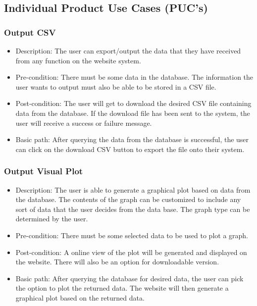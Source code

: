 \documentclass[12pt]{article}
\begin{document}
\newpage  \subsection{Individual Product Use Cases (PUC's)}
\subsubsection{Output CSV}
\begin{itemize}
  \item Description: The user can export/output the data that they have received
  from any function on the website system.
  \item Pre-condition: There must be some data in the database. The information
  the user wants to output must also be able to be stored in a CSV file.
  \item Post-condition: The user will get to download the desired CSV file
  containing data from the database. If the download file has been sent to the
  system, the user will receive a success or failure message.
  \item Basic path: After querying the data from the database is successful, the
  user can click on the download CSV button to export the file onto their system.
\end{itemize}

\subsubsection{Output Visual Plot}
\begin{itemize}
  \item Description: The user is able to generate a graphical plot based on data
  from the database. The contents of the graph can be customized to include any
  sort of data that the user decides from the data base. The graph type can be determined by the user. 
  \item Pre-condition: There must be some selected data to be used to plot a graph.
  \item Post-condition: A online view of the plot will be generated and
  displayed on the website. There will also be an option for downloadable version. 
  \item Basic path: After querying the database for desired data, the user can
  pick the option to plot the returned data. The website will then generate a
  graphical plot based on the returned data.
\end{itemize}
\end{document}
